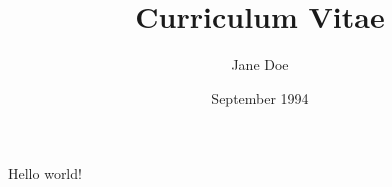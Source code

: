 \documentclass{article}
\title{Curriculum Vitae}
\author{Jane Doe}
\date{September 1994}
\begin{document}
   \maketitle
   Hello world!
\end{document}
